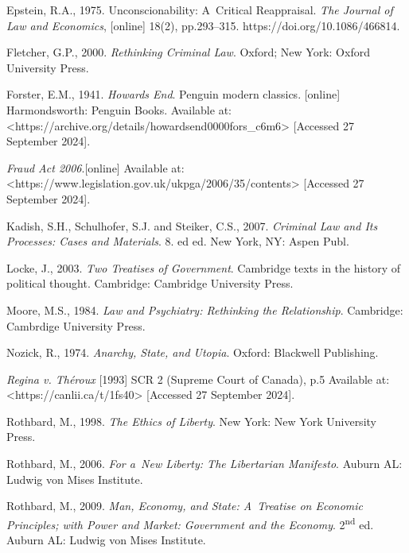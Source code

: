 {Epstein, R.A., 1975. Unconscionability: A~Critical Reappraisal. \textit{The Journal of Law and Economics}, [online] 18(2), pp.293–315. https://doi.org/10.1086/466814.



Fletcher, G.P., 2000. \textit{Rethinking Criminal Law}. Oxford; New York: Oxford University Press.



Forster, E.M., 1941. \textit{Howards End}. Penguin modern classics. [online] Harmondsworth: Penguin Books. Available at: {\textless}https://archive.org/details/howardsend0000fors\_c6m6{\textgreater} [Accessed 27 September 2024].



\textit{Fraud Act 2006}.[online] Available at: {\textless}https://www.legislation.gov.uk/ukpga/2006/35/contents{\textgreater} [Accessed 27 September 2024].



Kadish, S.H., Schulhofer, S.J. and Steiker, C.S., 2007. \textit{Criminal Law and Its Processes: Cases and Materials}. 8. ed ed. New York, NY: Aspen Publ.



Locke, J., 2003. \textit{Two Treatises of Government}. Cambridge texts in the history of political thought. Cambridge: Cambridge University Press.



Moore, M.S., 1984. \textit{Law and Psychiatry: Rethinking the Relationship}. Cambridge: Cambrdige University Press.



Nozick, R., 1974. \textit{Anarchy, State, and Utopia}. Oxford: Blackwell Publishing.



\textit{Regina v. Théroux} [1993] SCR 2 (Supreme Court of Canada), p.5 Available at: {\textless}https://canlii.ca/t/1fs40{\textgreater} [Accessed 27 September 2024].



Rothbard, M., 1998. \textit{The Ethics of Liberty}. New York: New York University Press.



Rothbard, M., 2006. \textit{For a~New Liberty: The Libertarian Manifesto}. Auburn AL: Ludwig von Mises Institute.



Rothbard, M., 2009. \textit{Man, Economy, and State: A~Treatise on Economic Principles; with Power and Market: Government and the Economy}. 2\textsuperscript{nd} ed. Auburn AL: Ludwig von Mises Institute.



}
